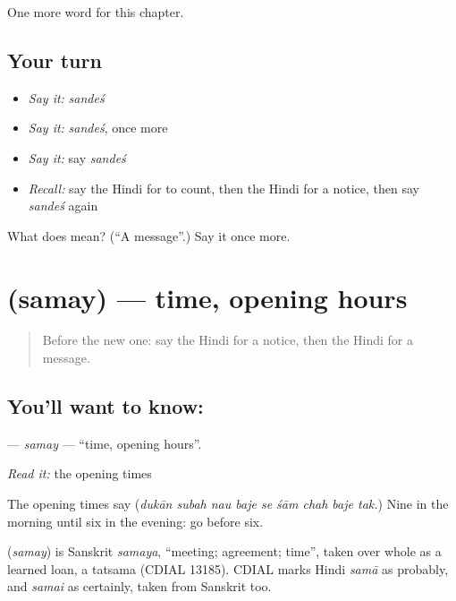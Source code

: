 \begin{grammarlens}[title={What you've built}]
One more word for this chapter.
\end{grammarlens}

\subsection*{Your turn}
\begin{itemize}
\raggedright
  \item \emph{Say it:} \emph{sandeś}
  \item \emph{Say it:} \emph{sandeś}, once more
  \item \emph{Say it:} say \emph{sandeś}
  \item \emph{Recall:} say the Hindi for to count, then the Hindi for a notice, then say \emph{sandeś} again
\end{itemize}

\begin{tcolorbox}[breakable,colback=teal!4,colframe=teal!35!black,title={Before you move on}]
What does  mean? (\textquotedblleft{}A message\textquotedblright{}.) Say it once more.
\end{tcolorbox}
\section[\texorpdfstring{\hi{समय} (samay)}{समय (samay)}]{ (samay) — time, opening hours}

\label{lesson:HI-C166-samay}



\begin{quote}
Before the new one: say the Hindi for a notice, then the Hindi for a message.
\end{quote}

\subsection*{You'll want to know: }
\textbf{} — \emph{samay} — \textquotedblleft{}time, opening hours\textquotedblright{}.

\emph{Read it:} the opening times

The opening times say \textbf{        } (\emph{dukān subah nau baje se śām chah baje tak.}) Nine in the morning until six in the evening: go before six.

\begin{cousinweb}
\textbf{} (\emph{samay}) is Sanskrit \emph{samaya}, \textquotedblleft{}meeting; agreement; time\textquotedblright{}, taken over whole as a learned loan, a tatsama (CDIAL 13185). CDIAL marks Hindi \emph{samā} as probably, and \emph{samai} as certainly, taken from Sanskrit too.
\end{cousinweb}

